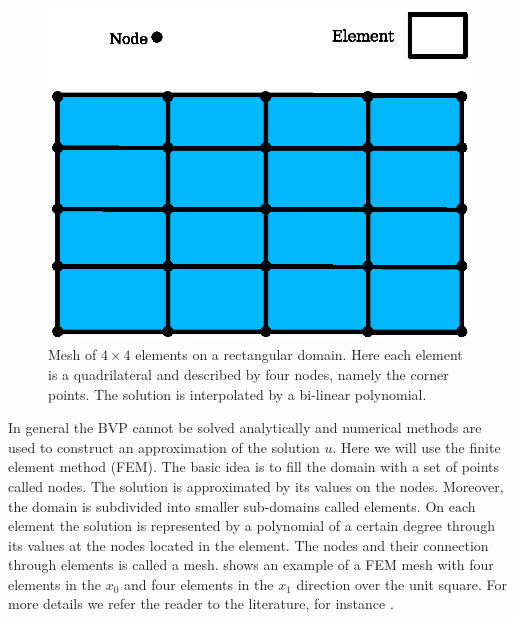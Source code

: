 \begin{figure}[ht]
    \centerline{\includegraphics{FirstStepMesh}}
    \caption{Mesh of $4 \times 4$ elements on a rectangular domain. Here
    each element is a quadrilateral and described by four nodes, namely
    the corner points. The solution is interpolated by a bi-linear
    polynomial.}
    \label{fig:FirstSteps.2}
\end{figure}

In general the BVP cannot be solved
analytically and numerical methods are used to construct an
approximation of the solution $u$.
Here we will use the finite element method
(FEM).
The basic idea is to fill the domain with a set of points called nodes.
The solution is approximated by its values on the nodes.
Moreover, the domain is subdivided into smaller sub-domains called
elements.
On each element the solution is represented by a polynomial of a certain
degree through its values at the nodes located in the element.
The nodes and their connection through elements is called a
mesh.  shows an
example of a FEM mesh with four elements in the $x_0$ and four elements
in the $x_1$ direction over the unit square.
For more details we refer the reader to the literature, for instance .

